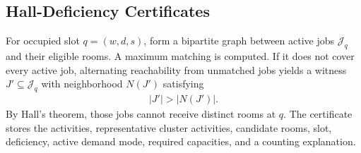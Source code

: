 \subsection{Hall-Deficiency Certificates}
For occupied slot $q=(w,d,s)$, form a bipartite graph between active jobs $\mathcal{J}_q$ and their eligible rooms.
A maximum matching is computed.
If it does not cover every active job, alternating reachability from unmatched jobs yields a witness $J'\subseteq\mathcal{J}_q$ with neighborhood $N(J')$ satisfying
\begin{align}
|J'|>|N(J')|.
\end{align}
By Hall's theorem, those jobs cannot receive distinct rooms at $q$.
The certificate stores the activities, representative cluster activities, candidate rooms, slot, deficiency, active demand mode, required capacities, and a counting explanation.

